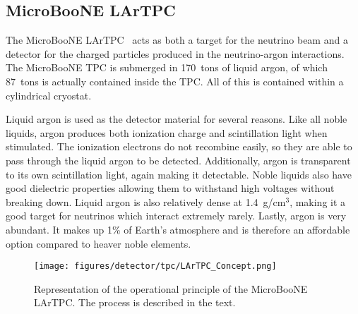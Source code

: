 \subsection{MicroBooNE LArTPC}\label{sec:lartpc}
  The MicroBooNE LArTPC~\cite{detector} acts as both a target for the
  neutrino beam and a detector for the charged particles produced in the
  neutrino-argon interactions. The MicroBooNE TPC is submerged in 170~tons of
  liquid argon, of which 87~tons is actually contained inside the TPC. All of
  this is contained within a cylindrical cryostat.
  
  Liquid argon is used as the detector material for several reasons. Like all
  noble liquids, argon produces both ionization charge and scintillation
  light when stimulated.  The ionization electrons do not recombine easily,
  so they are able to pass through the liquid argon to be detected.
  Additionally, argon is transparent to its own scintillation light, again
  making it detectable. Noble liquids also have good dielectric properties
  allowing them to withstand high voltages without breaking down. Liquid
  argon is also relatively dense at 1.4~g/cm$^3$, making it a good target for
  neutrinos which interact extremely rarely. Lastly, argon is very abundant.
  It makes up 1\% of Earth's atmosphere and is therefore an affordable option
  compared to heaver noble elements.

  \begin{figure}[h]
    \centering
    \texttt{[image: figures/detector/tpc/LArTPC\_Concept.png]}
    \caption{Representation of the operational principle of the MicroBooNE
    LArTPC. The process is described in the text.}
    \label{fig:tpccartoon}
  \end{figure}


